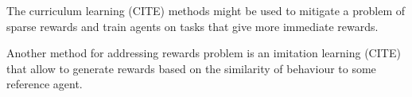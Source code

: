
The curriculum learning (CITE) methods might be used to mitigate a problem of sparse rewards and train agents on tasks that give more immediate rewards.

Another method for addressing rewards problem is an imitation learning (CITE) that allow to generate rewards based on the similarity of behaviour to some reference agent.





